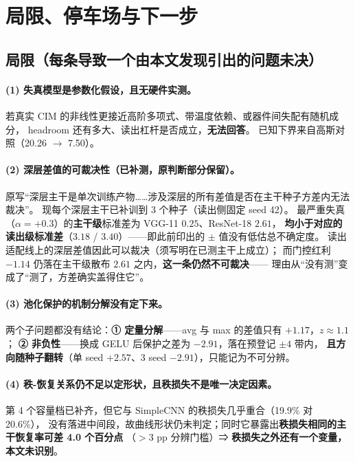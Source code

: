 \documentclass[11pt,a4paper]{ctexart}
\begin{document}
\section{局限、停车场与下一步}
\label{sec:backlog}

\subsection{局限（每条导致一个由本文发现引出的问题未决）}

\paragraph{(1) 失真模型是参数化假设，且无硬件实测。}
若真实 CIM 的非线性更接近高阶多项式、带温度依赖、或器件间失配有随机成分，
headroom 还有多大、读出杠杆是否成立，\textbf{无法回答}。
已知下界来自高斯对照（20.26 $\to$ 7.50）。

\paragraph{(2) 深层差值的可裁决性（已补测，原判断部分保留）。}
原写“深层主干是单次训练产物……涉及深层的所有差值是否在主干种子方差内无法裁决”。
现每个深层主干已补训到 3 个种子（读出侧固定 seed 42）。
最严重失真（$\alpha=+0.3$）的\textbf{主干级}标准差为 VGG-11 $0.25$、ResNet-18 $2.61$，
\textbf{均小于对应的读出级标准差}（$3.18$ / $3.40$）——即此前印出的 $\pm$ 值没有低估总不确定度。
读出适配线上的深层差值因此可以裁决（须写明在已测主干上成立）；
而门控红利 $-1.14$ 仍落在主干级散布 $2.61$ 之内，\textbf{这一条仍然不可裁决}——
理由从“没有测”变成了“测了，方差确实盖得住它”。

\paragraph{(3) 池化保护的机制分解没有定下来。}
两个子问题都没有结论：\textbf{① 定量分解}——avg 与 max 的差值只有 $+1.17$，$z\approx1.1$；
\textbf{② 非负性}——换成 GELU 后保护之差为 $-2.91$，落在预登记 $\pm4$ 带内，
\textbf{且方向随种子翻转}（单 seed $+2.57$、3 seed $-2.91$），只能记为不可分辨。

\paragraph{(4) 秩-恢复关系仍不足以定形状，且秩损失不是唯一决定因素。}
第 4 个容量档已补齐，但它与 SimpleCNN 的秩损失几乎重合（19.9\% 对 20.6\%），
没有落进中间段，故曲线形状仍未判定；同时它暴露出\textbf{秩损失相同的主干恢复率可差 4.0 个百分点}
（$>3$ pp 分辨门槛）⇒ \textbf{秩损失之外还有一个变量，本文未识别}。
\end{document}
